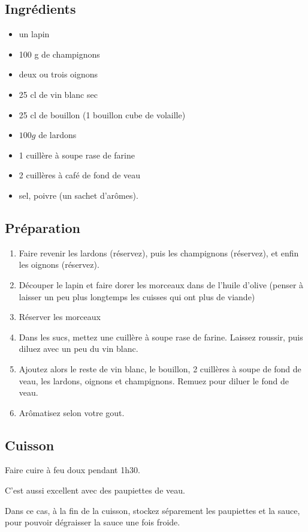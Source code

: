 \subsection*{Ingrédients}
\begin{itemize}
\item un lapin
\item 100 g de champignons
\item deux ou trois oignons
\item 25 cl de vin blanc sec
\item 25 cl de bouillon (1 bouillon cube de volaille)
\item $100\unit{g}$ de lardons
\item 1 cuillère à soupe rase de farine
\item 2 cuillères à café de fond de veau
\item sel, poivre (un sachet d'arômes).
\end{itemize}

\subsection*{Préparation}
\begin{enumerate}
\item Faire revenir les lardons (réservez), puis les champignons (réservez), et enfin les oignons (réservez).
\item Découper le lapin et faire dorer les morceaux dans de l'huile d'olive (penser à laisser un peu plus longtemps les cuisses qui ont plus de viande)
\item Réserver les morceaux
\item Dans les sucs, mettez une cuillère à soupe rase de farine. Laissez roussir, puis diluez avec un peu du vin blanc.
\item Ajoutez alors le reste de vin blanc, le bouillon, 2 cuillères à soupe de fond de veau, les lardons, oignons et champignons. Remuez pour diluer le fond de veau.
\item Arômatisez selon votre gout.
\end{enumerate}

\subsection*{Cuisson}
Faire cuire à feu doux pendant 1h30.

\begin{remarque}
C'est aussi excellent avec des paupiettes de veau.

Dans ce cas, à la fin de la cuisson, stockez séparement les paupiettes et la sauce, pour pouvoir dégraisser la sauce une fois froide.
\end{remarque}

